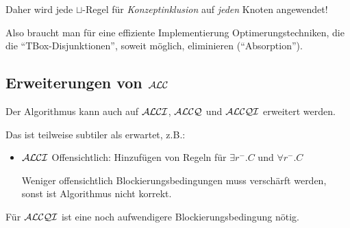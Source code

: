 Daher wird jede $\sqcup$-Regel für \emph{Konzeptinklusion} auf \emph{jeden} Knoten angewendet!

Also braucht man für eine effiziente Implementierung Optimerungstechniken, die die \enquote{TBox-Disjunktionen}, soweit möglich, eliminieren (\enquote{Absorption}).

\begin{tafel}

\end{tafel}

\subsection{Erweiterungen von \texorpdfstring{$\mathcal{A}\mathcal{L}\mathcal{C}$}{ALC}}

Der Algorithmus kann auch auf $\mathcal{A}\mathcal{L}\mathcal{C}\mathcal{I}$, $\mathcal{A}\mathcal{L}\mathcal{C}\mathcal{Q}$ und $\mathcal{A}\mathcal{L}\mathcal{C}\mathcal{Q}\mathcal{I}$ erweitert werden.

Das ist teilweise subtiler als erwartet, z.B.:

\begin{itemize}
	\item $\mathcal{A}\mathcal{L}\mathcal{C}\mathcal{I}$
	Offensichtlich: Hinzufügen von Regeln für $\exists r^{-}.C$ und $\forall r^-.C$

	Weniger offensichtlich Blockierungsbedingungen muss verschärft werden, sonst ist Algorithmus nicht korrekt.
\end{itemize}

Für $\mathcal{A}\mathcal{L}\mathcal{C}\mathcal{Q}\mathcal{I}$ ist eine noch aufwendigere Blockierungsbedingung nötig.
